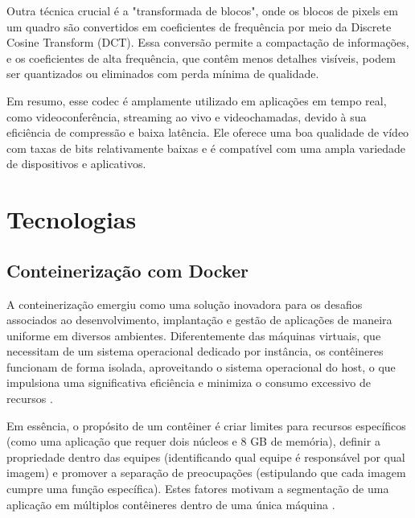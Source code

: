 \documentclass[12pt, %
openright, 
oneside, %
a4paper,    %
brazil]{facom-ufu-abntex2}
\begin{document}
Outra técnica crucial é a "transformada de blocos", onde os blocos de pixels em
um quadro são convertidos em coeficientes de frequência por meio da Discrete
Cosine Transform (DCT). Essa conversão permite a compactação de informações, e
os coeficientes de alta frequência, que contêm menos detalhes visíveis, podem
ser quantizados ou eliminados com perda mínima de qualidade. \cite{1626286}

Em resumo, esse codec é amplamente utilizado em aplicações em tempo real, como
videoconferência, streaming ao vivo e videochamadas, devido à sua eficiência de
compressão e baixa latência. Ele oferece uma boa qualidade de vídeo com taxas
de bits relativamente baixas e é compatível com uma ampla variedade de
dispositivos e aplicativos.



\section{Tecnologias}

\subsection{Conteinerização com Docker}

A conteinerização emergiu como uma solução inovadora para os desafios
associados ao desenvolvimento, implantação e gestão de aplicações de maneira
uniforme em diversos ambientes. Diferentemente das máquinas virtuais, que
necessitam de um sistema operacional dedicado por instância, os contêineres
funcionam de forma isolada, aproveitando o sistema operacional do host, o que
impulsiona uma significativa eficiência e minimiza o consumo excessivo de
recursos \cite{burns2018designing}.

Em essência, o propósito de um contêiner é criar limites para recursos
específicos (como uma aplicação que requer dois núcleos e 8 GB de memória),
definir a propriedade dentro das equipes (identificando qual equipe é
responsável por qual imagem) e promover a separação de preocupações
(estipulando que cada imagem cumpre uma função específica). Estes fatores
motivam a segmentação de uma aplicação em múltiplos contêineres dentro de uma
única máquina \cite{burns2018designingpart1}.
\end{document}
